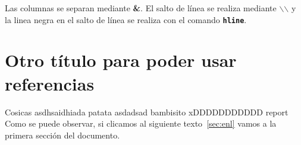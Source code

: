 \documentclass[10pt,a4paper,titlepage]{article} %
\begin{document}
	Las columnas se separan mediante \textbf{\&}. El salto de línea se realiza mediante \textbf{$\backslash$$\backslash$} y la linea negra en el salto de línea se realiza con el comando \textbf{\texttt{hline}}.

	\newpage
	\section{Otro título para poder usar referencias}
	Cosicas asdhsaidhiada patata asdadsad bambisito xDDDDDDDDDDD report \\
	Como se puede observar, si clicamos al siguiente texto~\ref{sec:enl} vamos a la primera sección del documento.
\end{document}
